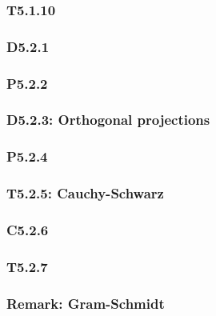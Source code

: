 \documentclass{article}
\begin{document}
\begin{multicols*}{3}
\subsubsection*{T5.1.10}

\subsubsection*{D5.2.1}

\subsubsection*{P5.2.2}

\subsubsection*{D5.2.3: Orthogonal projections}

\subsubsection*{P5.2.4}

\subsubsection*{T5.2.5: Cauchy-Schwarz}

\subsubsection*{C5.2.6}

\subsubsection*{T5.2.7}

\subsubsection*{Remark: Gram-Schmidt}

\end{multicols*}
\end{document}
